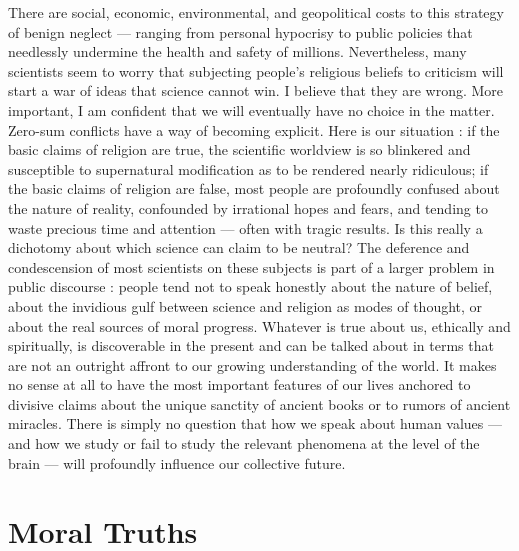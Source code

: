 \documentclass[a4paper,14pt]{extarticle}
\begin{document}
There are social, economic, environmental, and geopolitical costs to this strategy of benign neglect --- ranging from personal hypocrisy to public policies that needlessly undermine the health and safety of millions.
Nevertheless, many scientists seem to worry that subjecting people's religious beliefs to criticism will start a war of ideas that science cannot win.
I believe that they are wrong.
More important, I am confident that we will eventually have no choice in the matter.
Zero-sum conflicts have a way of becoming explicit.
Here is our situation :
if the basic claims of religion are true, the scientific worldview is so blinkered and susceptible to supernatural modification as to be rendered nearly ridiculous;
if the basic claims of religion are false, most people are profoundly confused about the nature of reality, confounded by irrational hopes and fears, and tending to waste precious time and attention --- often with tragic results.
Is this really a dichotomy about which science can claim to be neutral?
The deference and condescension of most scientists on these subjects is part of a larger problem in public discourse :
people tend not to speak honestly about the nature of belief, about the invidious gulf between science and religion as modes of thought, or about the real sources of moral progress.
Whatever is true about us, ethically and spiritually, is discoverable in the present and can be talked about in terms that are not an outright affront to our growing understanding of the world.
It makes no sense at all to have the most important features of our lives anchored to divisive claims about the unique sanctity of ancient books or to rumors of ancient miracles.
There is simply no question that how we speak about human values --- and how we study or fail to study the relevant phenomena at the level of the brain --- will profoundly influence our collective future.

\newpage
\section{Moral Truths}
\end{document}
